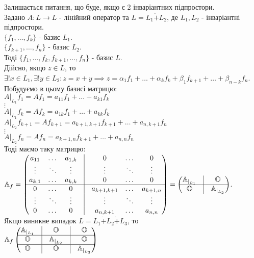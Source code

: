 \documentclass[a4paper, 10pt]{article}
\theoremstyle{theoremdd}
\theoremstyle{theoremdd}
\theoremstyle{theoremdd}
\theoremstyle{theoremdd}
\theoremstyle{theoremdd}
\theoremstyle{theoremdd}
\theoremstyle{theoremdd}
\theoremstyle{theoremdd}
\begin{document}
Залишається питання, що буде, якщо є 2 інваріантних підпростори.\\
Задано $A: L \to L$ - лінійний оператор та $L = L_1 \dot{+} L_2$, де $L_1,L_2$ - інваріантні підпростори.\\
$\{f_1,\dots,f_k\}$ - базис $L_1$.\\
$\{f_{k+1},\dots,f_{n}\}$ - базис $L_2$.\\
Тоді $\{f_1,\dots,f_k,f_{k+1},\dots,f_n\}$ - базис $L$.\\
Дійсно, якщо $z \in L$, то $\exists! x \in L_1, \exists! y \in L_2: z = x + y \implies z = \alpha_1 f_1 + \dots + \alpha_k f_k + \beta_1 f_{k+1} + \dots + \beta_{n-k}f_n$.\\
Побудуємо в цьому базисі матрицю:\\
$A|_{L_1}f_1 = Af_1 = a_{11}f_1 + \dots + a_{k1}f_k$\\
$\vdots$\\
$A|_{L_1}f_k = Af_k = a_{1k}f_1 + \dots + a_{kk}f_k$\\
$A|_{L_2}f_{k+1} = Af_{k+1} = a_{k+1,k+1}f_{k+1} + \dots + a_{n,k+1}f_n$\\
$\vdots$\\
$A|_{L_2}f_n = Af_n = a_{k+1,n}f_{k+1} + \dots + a_{n,n}f_n$\\
Тоді маємо таку матрицю:\\
$\mathbb{A}_f = \begin{pmatrix}
a_{11} & \dots & a_{1,k} & \vline & 0 & \dots & 0 \\
\vdots & \ddots & \vdots & \vline & \vdots & \ddots & \vdots \\
a_{k,1} & \dots & a_{k,k} & \vline & 0 & \dots & 0 \\
\hline
0 & \dots & 0 & \vline & a_{k+1,k+1} & \dots & a_{k+1, n} \\
\vdots & \ddots & \vdots & \vline & \vdots & \ddots & \vdots \\
0 & \dots & 0 & \vline & a_{n,k+1} & \dots & a_{n, n} \\
\end{pmatrix} = \begin{pmatrix}
\mathbb{A}_{|_{L_1}}  & \vline & \mathbb{O} \\
 \hline
 \mathbb{O} & \vline & \mathbb{A}_{|_{L_2}}
\end{pmatrix}$.
\bigskip \\
Якщо виникне випадок $L = L_1 \dot{+} L_2 \dot{+} L_3$, то\\
$\mathbb{A}_f \begin{pmatrix} 
\mathbb{A}_{|_{L_1}}  & \vline & \mathbb{O} & \vline & \mathbb{O} \\
 \hline
\mathbb{O}  & \vline & \mathbb{A}_{|_{L_2}} & \vline & \mathbb{O} \\
 \hline
\mathbb{O}  & \vline & \mathbb{O} & \vline & \mathbb{A}_{|_{L_3}} \\
\end{pmatrix}$
\end{document}
